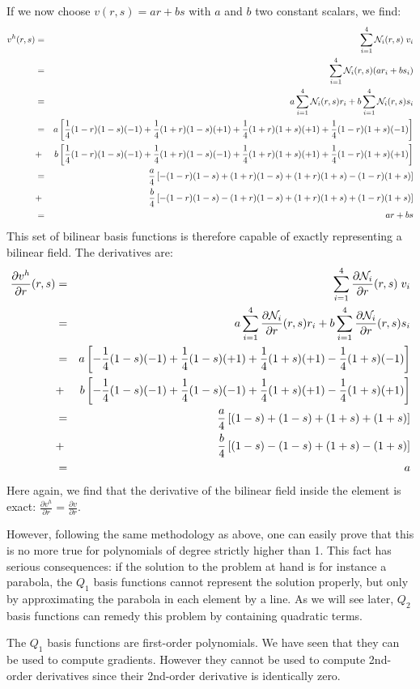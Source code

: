 If we now choose $v(r,s)=ar+bs$ with $a$ and $b$ two constant scalars, we find:
\begin{eqnarray}
v^h(r,s) 
&=& \sum_{i=1}^4 {\mathcal{N}}_i(r,s)\;  v_i  \nonumber\\
&=& \sum_{i=1}^4 {\mathcal{N}}_i(r,s) (ar_i+bs_i) \nonumber\\
&=& a \sum_{i=1}^4 {\mathcal{N}}_i(r,s) r_i + b \sum_{i=1}^4 {\mathcal{N}}_i(r,s) s_i \nonumber\\
&=& a \left[ 
 \frac14(1-r)(1-s)(-1)
+\frac14(1+r)(1-s)(+1)
+\frac14(1+r)(1+s)(+1)
+\frac14(1-r)(1+s)(-1) \right]  \nonumber\\
&+& b  
\left[ 
 \frac14(1-r)(1-s)(-1)
+\frac14(1+r)(1-s)(-1)
+\frac14(1+r)(1+s)(+1)
+\frac14(1-r)(1+s)(+1) \right]  \nonumber\\
&=& \frac{a}{4} \left[ 
-(1-r)(1-s)
+(1+r)(1-s)
+(1+r)(1+s)
-(1-r)(1+s) \right]  \nonumber\\
&+& \frac{b}{4}
\left[ 
-(1-r)(1-s)
-(1+r)(1-s)
+(1+r)(1+s)
+(1-r)(1+s) 
\right]  \nonumber\\
&=& ar+bs
\end{eqnarray}
This set of bilinear basis functions is therefore capable of exactly representing a bilinear field.
The derivatives are:
\begin{eqnarray}
\frac{\partial v^h}{\partial r}(r,s) 
&=& \sum_{i=1}^4 \frac{\partial {\mathcal{N}}_i}{\partial r}(r,s)\;  v_i  \\
&=& a \sum_{i=1}^4 \frac{\partial {\mathcal{N}}_i}{\partial r}(r,s) r_i 
+ b \sum_{i=1}^4 \frac{\partial {\mathcal{N}}_i}{\partial r}(r,s) s_i \\
&=& a \left[
- \frac14(1-s)(-1) 
+ \frac14(1-s)(+1) 
+ \frac14(1+s)(+1) 
- \frac14(1+s)(-1) 
\right] \nonumber\\
&+&b \left[
- \frac14(1-s)(-1) 
+ \frac14(1-s)(-1) 
+ \frac14(1+s)(+1) 
- \frac14(1+s)(+1) 
\right] \nonumber\\
&=& \frac{a}{4} \left[
 (1-s)
+ (1-s)
+ (1+s)
+ (1+s)
\right] \nonumber\\
&+&\frac{b}{4} \left[
 (1-s)
- (1-s)
+ (1+s)
- (1+s)
\right] \nonumber\\
&=& a 
\end{eqnarray}
Here again, we find that the derivative of the bilinear field inside the element is exact: 
$\frac{\partial v^h}{\partial r} = \frac{\partial v}{\partial r}$.

However, following the same methodology as above, one can easily prove 
that this is no more true for polynomials of degree strictly higher than 1. 
This fact has serious consequences: if the solution to the problem at hand is 
for instance a parabola, the $Q_1$ basis functions cannot represent the solution properly, 
but only by approximating the parabola in each element by a line. As we will see 
later, $Q_2$ basis functions can remedy this problem by containing quadratic terms.

\begin{remark}
The $Q_1$ basis functions are first-order polynomials. We have seen that they can be used to compute
gradients. However they cannot be used to compute 2nd-order derivatives since their 2nd-order
derivative is identically zero.
\end{remark}


